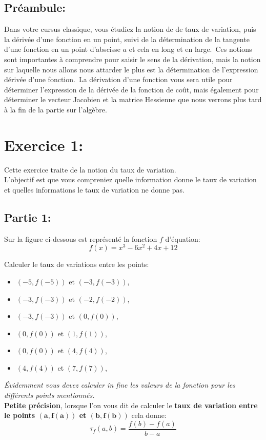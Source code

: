 \documentclass[11pt, french]{article}
\begin{document}
\subsection*{Préambule:}
Dans votre cursus classique, vous étudiez la notion de de taux de variation, puis la dérivée d'une fonction en un point, suivi de la détermination de la tangente d'une fonction en un point d'abscisse $a$ et cela en long et en large.\
Ces notions sont importantes à comprendre pour saisir le sens de la dérivation, mais la notion sur laquelle nous allons nous attarder le plus est la détermination de l'expression dérivée d'une fonction.\
La dérivation d'une fonction vous sera utile pour déterminer l'expression de la dérivée de la fonction de coût, mais également pour déterminer le vecteur Jacobien et la matrice Hessienne que nous verrons plus tard à la fin de la partie sur l'algèbre.


\section*{Exercice 1:}
Cette exercice traite de la notion du taux de variation.\\
L'objectif est que vous compreniez quelle information donne le taux de variation et quelles informations le taux de variation ne donne pas.

\subsection*{Partie 1:}
Sur la figure ci-dessous est représenté la fonction $f$ d'équation:
\begin{equation*}
    f(x) = x^3-6x^2+4x+12
\end{equation*}

Calculer le  taux de variations entre les points:
\begin{itemize}
    \item $(-5, f(-5))$ et $(-3, f(-3))$,
    \item $(-3, f(-3))$ et $(-2, f(-2))$,
    \item $(-3, f(-3))$ et $(0, f(0))$,
    \item $(0, f(0))$ et $(1, f(1))$,
    \item $(0, f(0))$ et $(4, f(4))$,
    \item $(4, f(4))$ et $(7, f(7))$,
\end{itemize}

\textit{Évidemment vous devez calculer in fine les valeurs de la fonction pour les différents points mentionnés.}\\
\textbf{Petite précision}, lorsque l'on vous dit de calculer le \textbf{taux de variation entre le points $\mathbf{(a, f(a))}$ et $\mathbf{(b, f(b))}$} cela donne:
\begin{equation*}
    \tau_f(a,b) = \frac{f(b)-f(a)}{b-a}
\end{equation*}
\end{document}
